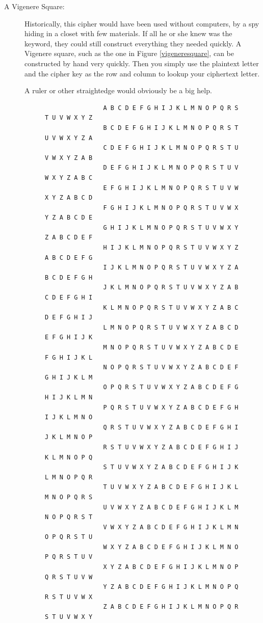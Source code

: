 \documentclass{article}
\begin{document}
\begin{description}
\item[A Vigenere Square:]  Historically, this cipher would have been
  used without computers, by a spy hiding in a closet with few
  materials. If all he or she knew was the keyword, they could still
  construct everything they needed quickly.  A Vigenere square, such
  as the one in Figure \ref{vigeneresquare}, can be constructed by
  hand very quickly.  Then you simply use the plaintext letter and the
  cipher key as the row and column to lookup your ciphertext letter. 

A ruler or other straightedge would obviously be a big help.

  \begin{figure}

{\small
\begin{Verbatim}
                A B C D E F G H I J K L M N O P Q R S T U V W X Y Z
                B C D E F G H I J K L M N O P Q R S T U V W X Y Z A 
                C D E F G H I J K L M N O P Q R S T U V W X Y Z A B 
                D E F G H I J K L M N O P Q R S T U V W X Y Z A B C 
                E F G H I J K L M N O P Q R S T U V W X Y Z A B C D 
                F G H I J K L M N O P Q R S T U V W X Y Z A B C D E 
                G H I J K L M N O P Q R S T U V W X Y Z A B C D E F 
                H I J K L M N O P Q R S T U V W X Y Z A B C D E F G 
                I J K L M N O P Q R S T U V W X Y Z A B C D E F G H 
                J K L M N O P Q R S T U V W X Y Z A B C D E F G H I 
                K L M N O P Q R S T U V W X Y Z A B C D E F G H I J 
                L M N O P Q R S T U V W X Y Z A B C D E F G H I J K 
                M N O P Q R S T U V W X Y Z A B C D E F G H I J K L 
                N O P Q R S T U V W X Y Z A B C D E F G H I J K L M 
                O P Q R S T U V W X Y Z A B C D E F G H I J K L M N 
                P Q R S T U V W X Y Z A B C D E F G H I J K L M N O 
                Q R S T U V W X Y Z A B C D E F G H I J K L M N O P 
                R S T U V W X Y Z A B C D E F G H I J K L M N O P Q 
                S T U V W X Y Z A B C D E F G H I J K L M N O P Q R 
                T U V W X Y Z A B C D E F G H I J K L M N O P Q R S 
                U V W X Y Z A B C D E F G H I J K L M N O P Q R S T 
                V W X Y Z A B C D E F G H I J K L M N O P Q R S T U 
                W X Y Z A B C D E F G H I J K L M N O P Q R S T U V 
                X Y Z A B C D E F G H I J K L M N O P Q R S T U V W 
                Y Z A B C D E F G H I J K L M N O P Q R S T U V W X
                Z A B C D E F G H I J K L M N O P Q R S T U V W X Y
\end{Verbatim}
}      


\end{figure}
\end{description}
\end{document}
